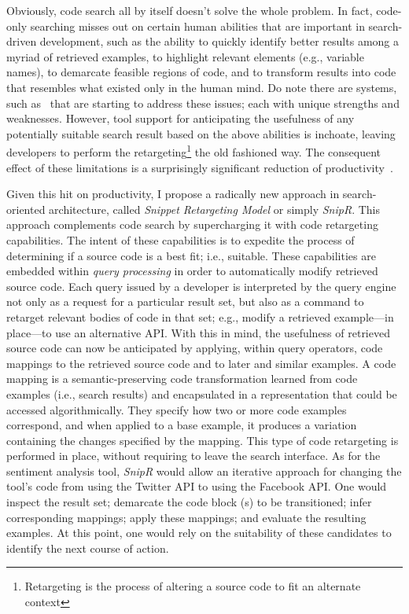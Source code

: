 Obviously, code search all by itself doesn't solve the whole problem. In fact, code-only searching misses out on certain human abilities that are important in search-driven development, such as the ability to quickly identify better results among a myriad of retrieved examples, to highlight relevant elements (e.g., variable names), to demarcate feasible regions of code, and to transform results into code that resembles what existed only in the human mind. Do note there are systems, such as~\cite{Bajracharya:2010um, Gysin:2010kt, Hartmann:2010hx, McMillan:2012dj, Sawadsky:2011eh, Wightman:2012gc} that are starting to address these issues; each with unique strengths and weaknesses. However, tool support for anticipating the usefulness of any potentially suitable search result based on the above abilities is inchoate, leaving developers to perform the retargeting\footnote{Retargeting is the process of altering a source code to fit an alternate context} the old fashioned way. The consequent effect of these limitations is a surprisingly significant reduction of productivity~\cite{Cypher:2010ub, Gysin:2010kt}.

Given this hit on productivity, I propose a radically new approach in search-oriented architecture, called \emph{Snippet Retargeting Model} or simply \emph{SnipR}. This approach complements code search by supercharging it with code retargeting capabilities. The intent of these capabilities is to expedite the process of determining if a source code is a best fit; i.e., suitable. These capabilities are embedded within \emph{query processing} in order to automatically modify retrieved source code. Each query issued by a developer is interpreted by the query engine not only as a request for a particular result set, but also as a command to retarget relevant bodies of code in that set; e.g., modify a retrieved example---in place---to use an alternative API. With this in mind, the usefulness of retrieved source code can now be anticipated by applying, within query operators, code mappings to the retrieved source code and to later and similar examples. A code mapping is a semantic-preserving code transformation learned from code examples (i.e., search results) and encapsulated in a representation that could be accessed algorithmically. They specify how two or more code examples correspond, and when applied to a base example, it produces a variation containing the changes specified by the mapping. This type of code retargeting is performed in place, without requiring to leave the search interface. As for the sentiment analysis tool, \emph{SnipR} would allow an iterative approach for changing the tool's code from using the Twitter API to using the Facebook API. One would inspect the result set; demarcate the code block (s) to be transitioned; infer corresponding mappings; apply these mappings; and evaluate the resulting examples. At this point, one would rely on the suitability of these candidates to identify the next course of action. 


